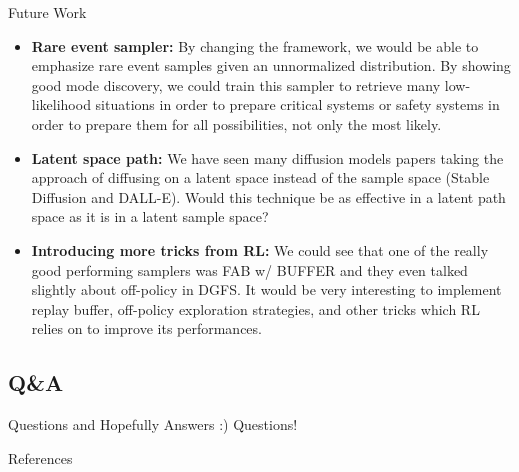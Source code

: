 \documentclass[aspectratio=169,xcolor=dvipsnames]{beamer}
\begin{document}
\begin{frame}{Future Work}
\footnotesize


\begin{itemize}\itemsep2pt
  \item \textbf{Rare event sampler:} By changing the framework, we would be able to emphasize rare event samples given an unnormalized distribution. By showing good mode discovery, we could train this sampler to retrieve many low-likelihood situations in order to prepare critical systems or safety systems in order to prepare them for all possibilities, not only the most likely.
  \item \textbf{Latent space path:} We have seen many diffusion models papers taking the approach of diffusing on a latent space instead of the sample space (Stable Diffusion and DALL-E). Would this technique be as effective in a latent path space as it is in a latent sample space?
  \item \textbf{Introducing more tricks from RL:} We could see that one of the really good performing samplers was FAB w/ BUFFER and they even talked slightly about off-policy in DGFS. It would be very interesting to implement replay buffer, off-policy exploration strategies, and other tricks which RL relies on to improve its performances.
\end{itemize}

\end{frame}

\subsection{Q\&A}

\begin{frame}{Questions and Hopefully Answers :)}
    \centering
    \Huge Questions!
\end{frame}

\begin{frame}[allowframebreaks]{References}
\footnotesize
\printbibliography
\end{frame}
\end{document}
